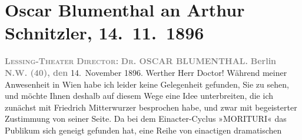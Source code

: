 

         
         \renewcommand{\erwaehntePersonen}{Personen: Friedrich Mitterwurzer}
         \renewcommand{\erwaehnteInstitutionen}{Institutionen: Lessing-Theater}
         \renewcommand{\erwaehnteOrte}{Orte: Berlin, Wien}
         \renewcommand{\erwaehnteWerke}{Werke: Abschiedssouper, Anatol, Die Frage an das Schicksal, Episode, Morituri, Weihnachts-Einkäufe}
               \section[Oscar Blumenthal an Arthur Schnitzler, 14. 11. 1896]{ Oscar Blumenthal an Arthur Schnitzler, 14. 11. 1896}\nopagebreak{}\rehead{ }\begin{ledgroupsized}[t]{13cm}\normalsize\beginnumbering \toendnotes[C]{\smallbreak\pagebreak[2]} 
\pstart
           \noindent{}\centering{}{\pb}\textcolor{gray}{\textbf{\textsc{Lessing-Theater}}}\pend
           \pstart
           \noindent{}\centering{}\textcolor{gray}{\textbf{\textsc{Director}:}}{ }\textcolor{gray}{\textbf{\textsc{Dr.}{ }OSCAR BLUMENTHAL.}}\pend
           \pstart
           \raggedleft{}\textcolor{gray}{\textbf{Berlin N.W. (40), den}}{ }14. November 1896.\pend
           \pstart\center{}Werther Herr Doctor!\pend\pstart
           Während meiner Anwesenheit in Wien habe ich leider
               keine Gelegenheit gefunden, Sie zu sehen, und möchte Ihnen deshalb auf diesem Wege
               eine Idee unterbreiten, die ich zunächst mit Friedrich Mitterwurzer besprochen habe, und zwar mit begeisterter Zustimmung
               von seiner Seite. Da bei dem Einacter-Cyclus »MORITURI« das Publikum sich geneigt gefunden hat, eine Reihe von einactigen dramatischen

\end{ledgroupsized}
